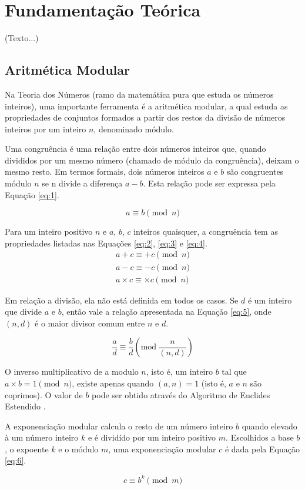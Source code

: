 \chapter{Fundamentação Teórica}\label{cap:fundamentacao}
(Texto...)

%
%

\section{Aritmética Modular} \label{sec:aritmeticamodular}
Na Teoria dos Números \cite{niven2014} (ramo da matemática pura que estuda os números inteiros), uma importante ferramenta é a aritmética modular,  a qual estuda as propriedades de conjuntos formados a partir dos restos da divisão de números inteiros por um inteiro $n$, denominado módulo.
\par Uma congruência é  uma relação entre dois números inteiros que, quando divididos por um mesmo número (chamado de módulo da congruência), deixam o mesmo resto.  Em termos formais, dois números inteiros \(a\) e \(b\) são congruentes módulo \(n\) se n divide a diferença \(a - b\).  Esta relação pode ser expressa pela Equação \ref{eq:1}.

\begin{equation}
  a \equiv b \pmod n \label{eq:1}
\end{equation}

Para um inteiro positivo \(n\) e \(a\), \(b\), \(c\) inteiros quaisquer, a congruência tem as propriedades listadas nas Equações \ref{eq:2}, \ref{eq:3} e \ref{eq:4}.
\begin{eqnarray}
  a + c \equiv + c \pmod n \label{eq:2} \\
  a - c \equiv - c \pmod n \label{eq:3} \\
  a \times c \equiv \times c \pmod n \label{eq:4} 
\end{eqnarray}

Em relação a divisão, ela não está definida em todos os casos. Se \(d\) é um inteiro que divide \(a\) e \(b\), então vale a relação apresentada na Equação \ref{eq:5}, onde \((n, d)\) é o maior divisor comum entre \(n\) e \(d\).

\begin{equation}
  \frac{a}{d} \equiv \frac{b}{d}\left(\mbox{mod}\ \frac{n}{(n,d)}\right) \label{eq:5}%
\end{equation} 

O inverso multiplicativo de a modulo \(n\), isto é, um inteiro \(b\) tal que \(a \times b = 1 \pmod  n\), existe apenas quando \((a, n) = 1\) (isto é, $a$ e $n$ são coprimos). O valor de \(b\) pode ser obtido através do Algoritmo de Euclides Estendido \cite{halim2013}.
\par A exponenciação modular calcula o resto de um número inteiro \(b\) quando elevado à um número inteiro \(k\) e é dividído por um inteiro positivo \(m\). Escolhidos a base \(b\), o expoente \(k\) e o módulo \(m\), uma exponenciação modular \(c\) é dada pela Equação \ref{eq:6}.

\begin{equation}
  c \equiv b^{k}\pmod m \label{eq:6}
\end{equation}
